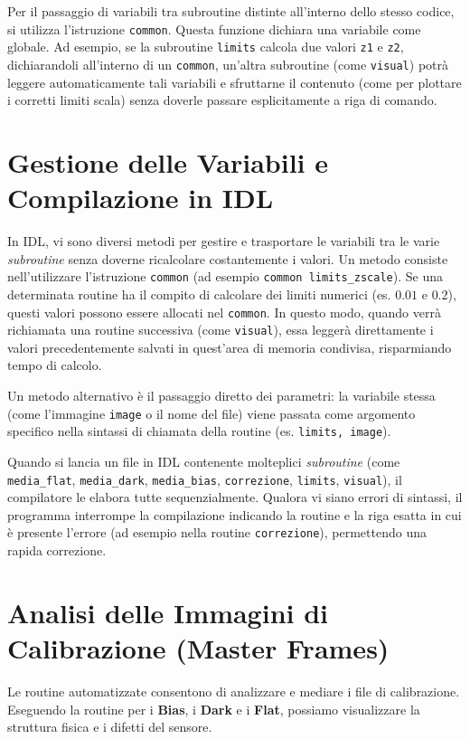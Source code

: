 Per il passaggio di variabili tra subroutine distinte all'interno dello stesso codice, si utilizza l'istruzione \texttt{common}. Questa funzione dichiara una variabile come globale.
Ad esempio, se la subroutine \texttt{limits} calcola due valori \texttt{z1} e \texttt{z2}, dichiarandoli all'interno di un \texttt{common}, un'altra subroutine (come \texttt{visual}) potrà leggere automaticamente tali variabili e sfruttarne il contenuto (come per plottare i corretti limiti scala) senza doverle passare esplicitamente a riga di comando.

\section{Gestione delle Variabili e Compilazione in IDL}

In IDL, vi sono diversi metodi per gestire e trasportare le variabili tra le varie \textit{subroutine} senza doverne ricalcolare costantemente i valori. Un metodo consiste nell'utilizzare l'istruzione \texttt{common} (ad esempio \texttt{common limits\_zscale}). Se una determinata routine ha il compito di calcolare dei limiti numerici (es. $0.01$ e $0.2$), questi valori possono essere allocati nel \texttt{common}. In questo modo, quando verrà richiamata una routine successiva (come \texttt{visual}), essa leggerà direttamente i valori precedentemente salvati in quest'area di memoria condivisa, risparmiando tempo di calcolo.

Un metodo alternativo è il passaggio diretto dei parametri: la variabile stessa (come l'immagine \texttt{image} o il nome del file) viene passata come argomento specifico nella sintassi di chiamata della routine (es. \texttt{limits, image}).

Quando si lancia un file in IDL contenente molteplici \textit{subroutine} (come \texttt{media\_flat}, \texttt{media\_dark}, \texttt{media\_bias}, \texttt{correzione}, \texttt{limits}, \texttt{visual}), il compilatore le elabora tutte sequenzialmente. Qualora vi siano errori di sintassi, il programma interrompe la compilazione indicando la routine e la riga esatta in cui è presente l'errore (ad esempio nella routine \texttt{correzione}), permettendo una rapida correzione.

\section{Analisi delle Immagini di Calibrazione (Master Frames)}

Le routine automatizzate consentono di analizzare e mediare i file di calibrazione. Eseguendo la routine per i \textbf{Bias}, i \textbf{Dark} e i \textbf{Flat}, possiamo visualizzare la struttura fisica e i difetti del sensore.

